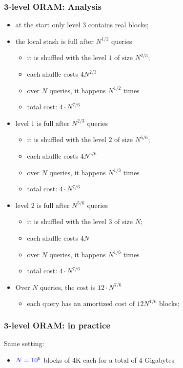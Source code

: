\documentclass[]{beamer}
\begin{document}
{\begin{frame}
\frametitle{3-level ORAM: Analysis}
\begin{itemize}[<+->]
\item at the start only level $3$ contains {\color{teal} real blocks};
\item {\color{blue} the local stash is full after $N^{1/2}$ queries}
\begin{itemize}
\item it is shuffled with the level $1$ of size $N^{2/3}$;
\item each shuffle costs $4 N^{2/3}$
\item over $N$ queries, it happens $N^{1/2}$ times
\item total cost: $4\cdot N^{7/6}$
\end{itemize}
\item {\color{blue} level $1$ is full after $N^{2/3}$ queries}
\begin{itemize}
\item it is shuffled with the level $2$ of size $N^{5/6}$;
\item each shuffle costs $4 N^{5/6}$
\item over $N$ queries, it happens $N^{1/3}$ times
\item total cost: $4\cdot N^{7/6}$
\end{itemize}
\item {\color{blue} level $2$ is full after $N^{5/6}$ queries}
\begin{itemize}
\item it is shuffled with the level $3$ of size $N$;
\item each shuffle costs $4 N$
\item over $N$ queries, it happens $N^{1/6}$ times
\item total cost: $4\cdot N^{7/6}$
\end{itemize}
\item {\color{blue} Over $N$ queries, the cost is $12\cdot N^{7/6}$}
\begin{itemize}
\item {\color{magenta} each query has an amortized cost of $12N^{1/6}$ blocks;}
\end{itemize}
\end{itemize}
\end{frame}

\begin{frame}
\frametitle{3-level ORAM: in practice}

{\color{brown} Same setting: }
\begin{itemize}
\item $\color{blue} N=10^6$ blocks of $4$K each for a total of $4$ Gigabytes


\end{itemize}
\end{frame}}
\end{document}
